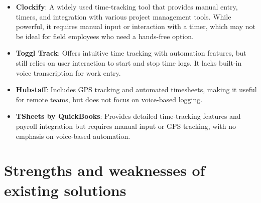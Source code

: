 \documentclass[
  digital,     %
  oneside,     %
  nosansbold,  %
  nocolorbold, %
  lof,         %
  lot,         %
]{fithesis4}
\begin{document}
\begin{itemize}
\item \textbf{Clockify}: A widely used time-tracking tool that provides manual entry, timers, and integration with various project management tools. While powerful, it requires manual input or interaction with a timer, which may not be ideal for field employees who need a hands-free option.
\item \textbf{Toggl Track}: Offers intuitive time tracking with automation features, but still relies on user interaction to start and stop time logs. It lacks built-in voice transcription for work entry.
\item \textbf{Hubstaff}: Includes GPS tracking and automated timesheets, making it useful for remote teams, but does not focus on voice-based logging.
\item \textbf{TSheets by QuickBooks}: Provides detailed time-tracking features and payroll integration but requires manual input or GPS tracking, with no emphasis on voice-based automation.
\end{itemize}

\section{Strengths and weaknesses of existing solutions}
\end{document}
